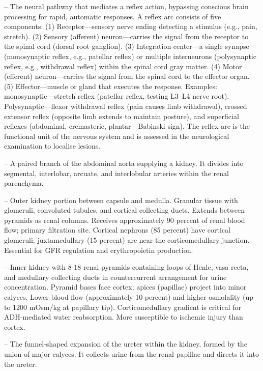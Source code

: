 -- The neural pathway that mediates a reflex action, bypassing conscious brain processing for rapid, automatic responses. A reflex arc consists of five components: (1) Receptor—sensory nerve ending detecting a stimulus (e.g., pain, stretch). (2) Sensory (afferent) neuron—carries the signal from the receptor to the spinal cord (dorsal root ganglion). (3) Integration center—a single synapse (monosynaptic reflex, e.g., patellar reflex) or multiple interneurons (polysynaptic reflex, e.g., withdrawal reflex) within the spinal cord gray matter. (4) Motor (efferent) neuron—carries the signal from the spinal cord to the effector organ. (5) Effector—muscle or gland that executes the response. Examples: monosynaptic—stretch reflex (patellar reflex, testing L3--L4 nerve root). Polysynaptic—flexor withdrawal reflex (pain causes limb withdrawal), crossed extensor reflex (opposite limb extends to maintain posture), and superficial reflexes (abdominal, cremasteric, plantar—Babinski sign). The reflex arc is the functional unit of the nervous system and is assessed in the neurological examination to localise lesions.

-- A paired branch of the abdominal aorta supplying a kidney. It divides into segmental, interlobar, arcuate, and interlobular arteries within the renal parenchyma.

-- Outer kidney portion between capsule and medulla. Granular tissue with glomeruli, convoluted tubules, and cortical collecting ducts. Extends between pyramids as renal columns. Receives approximately 90 percent of renal blood flow; primary filtration site. Cortical nephrons (85 percent) have cortical glomeruli; juxtamedullary (15 percent) are near the corticomedullary junction. Essential for GFR regulation and erythropoietin production.

-- Inner kidney with 8-18 renal pyramids containing loops of Henle, vasa recta, and medullary collecting ducts in countercurrent arrangement for urine concentration. Pyramid bases face cortex; apices (papillae) project into minor calyces. Lower blood flow (approximately 10 percent) and higher osmolality (up to 1200 mOsm/kg at papillary tip). Corticomedullary gradient is critical for ADH-mediated water reabsorption. More susceptible to ischemic injury than cortex.

-- The funnel-shaped expansion of the ureter within the kidney, formed by the union of major calyces. It collects urine from the renal papillae and directs it into the ureter.

